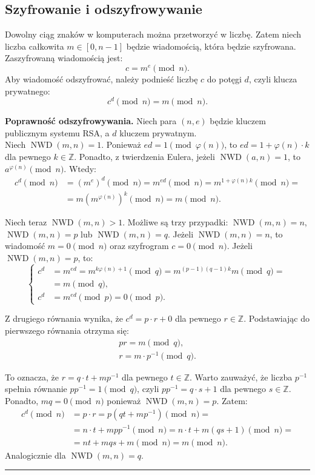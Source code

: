 \documentclass[12pt,twoside,a4]{mwbk}
\theoremstyle{definition}
\newenvironment{dowod}[1][Dowód]{\noindent\textbf{#1.} }{\newline\smallskip \hfill \rule{0.5em}{0.5em}}
\DeclareMathOperator{\NWD}{NWD}
\begin{document}
\subsection{Szyfrowanie i odszyfrowywanie}
Dowolny ciąg znaków w komputerach można przetworzyć w liczbę. Zatem niech liczba całkowita $m \in [0, n-1]$ będzie wiadomością, która będzie szyfrowana. Zaszyfrowaną wiadomością jest:
\[ c = m^e \pmod{n}. \]
Aby wiadomość odszyfrować, należy podnieść liczbę $c$ do potęgi $d$, czyli klucza prywatnego:
\[ c^d \pmod{n} = m \pmod{n}. \]

\begin{dowod}[Poprawność odszyfrowywania]
Niech para $(n,e)$ będzie kluczem publicznym systemu RSA, a $d$ kluczem prywatnym. \\
Niech $\NWD(m,n) =1$. Ponieważ $ed = 1 \pmod{\varphi(n)}$, to $ed = 1 + \varphi(n) \cdot k$ dla pewnego $k \in \mathbb{Z}$. Ponadto, z twierdzenia Eulera, jeżeli $\NWD(a,n) = 1$, to $a^{\varphi(n)} \pmod{n}$. Wtedy:
\begin{align*}
 c^d \pmod{n} &= (m^e)^d \pmod{n} = m^{ed} \pmod{n} = m^{1 + \varphi(n)k} \pmod{n} = \\
 &= m(m^{\varphi(n)})^k \pmod{n} = m \pmod{n}.
\end{align*}

Niech teraz $\NWD(m,n) > 1$. Możliwe są trzy przypadki: $\NWD(m,n) = n$, $\NWD(m,n) = p$ lub $\NWD(m,n) = q$. Jeżeli $\NWD(m,n)=n$, to wiadomość $m = 0 \pmod{n}$ oraz szyfrogram $c = 0 \pmod{n}$. Jeżeli $\NWD(m,n) = p$, to:
\[ \left\{ \begin{array}{ll}
c^d &= m^{ed}  = m^{k\varphi(n) + 1} \pmod{q} = m^{(p-1)(q-1)k}m \pmod{q}= \\
&= m \pmod{q}, \\
c^d &= m^{ed} \pmod{p} = 0 \pmod{p}.
\end{array} \right. \]

Z drugiego równania wynika, że $c^d = p \cdot r + 0$ dla pewnego $r \in \mathbb{Z}$. Podstawiając do pierwszego równania otrzyma się:
\[ \begin{array}{c} 
pr = m \pmod{q}, \\
r = m \cdot p^{-1} \pmod{q}.
\end{array} \]

To oznacza, że $r = q \cdot t + mp^{-1}$ dla pewnego $t \in \mathbb{Z}$. Warto zauważyć, że liczba $p^{-1}$ spełnia równanie $pp^{-1} = 1 \pmod{q}$, czyli $pp^{-1} = q \cdot s + 1$ dla pewnego $s \in \mathbb{Z}$. Ponadto, $mq = 0 \pmod{n}$ ponieważ $\NWD(m,n) = p$. Zatem:
\begin{align*}
c^d \pmod{n} &= p \cdot r = p (qt + mp^{-1}) \pmod{n} = \\
&= n \cdot t + m p p^{-1} \pmod{n} = n \cdot t + m (qs + 1) \pmod{n} = \\
&= nt + mqs + m \pmod{n} = m \pmod{n}.
\end{align*}
Analogicznie dla $\NWD(m,n)=q$.
\end{dowod}
\end{document}

